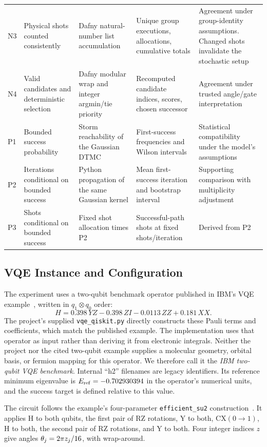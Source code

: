 \documentclass[conference]{IEEEtran}
\begin{document}
\begin{table}[!t]
\begin{tabularx}{\textwidth}{@{}p{}>{\raggedright\arraybackslash}p{}>{\raggedright\arraybackslash}p{}>{\raggedright\arraybackslash}p{}Y@{}}
N3 & Physical shots counted consistently & Dafny natural-number list accumulation & Unique group executions, allocations, cumulative totals & Agreement under group-identity assumptions. Changed shots invalidate the stochastic setup \\
N4 & Valid candidates and deterministic selection & Dafny modular wrap and integer argmin/tie priority & Recomputed candidate indices, scores, chosen successor & Agreement under trusted angle/gate interpretation \\
P1 & Bounded success probability & Storm reachability of the Gaussian DTMC & First-success frequencies and Wilson intervals & Statistical compatibility under the model's assumptions \\
P2 & Iterations conditional on bounded success & Python propagation of the same Gaussian kernel & Mean first-success iteration and bootstrap interval & Supporting comparison with multiplicity adjustment \\
P3 & Shots conditional on bounded success & Fixed shot allocation times P2 & Successful-path shots at fixed shots/iteration & Derived from P2 \\
\bottomrule
\end{tabularx}
\end{table}

\subsection{VQE Instance and Configuration}
\label{sec:instance}
The experiment uses a two-qubit benchmark operator published in IBM's VQE example~\cite{ibmvqe}, written in $q_1\otimes q_0$ order:
\begin{equation}
 H=0.398\,YZ-0.398\,ZI-0.0113\,ZZ+0.181\,XX.
 \label{eq:hamiltonian}
\end{equation}
The project's supplied \texttt{vqe\_qiskit.py} directly constructs these Pauli terms and coefficients, which match the published example. The implementation uses that operator as input rather than deriving it from electronic integrals. Neither the project nor the cited two-qubit example supplies a molecular geometry, orbital basis, or fermion mapping for this operator. We therefore call it the \emph{IBM two-qubit VQE benchmark}. Internal ``h2'' filenames are legacy identifiers. Its reference minimum eigenvalue is $E_{\rm ref}=-0.702930394$ in the operator's numerical units, and the success target is defined relative to this value.

The circuit follows the example's four-parameter \texttt{efficient\_su2} construction~\cite{ibmvqe}. It applies H to both qubits, the first pair of RZ rotations, Y to both, CX$(0\!\to\!1)$, H to both, the second pair of RZ rotations, and Y to both. Four integer indices $z$ give angles $\theta_j=2\pi z_j/16$, with wrap-around.
\end{document}
